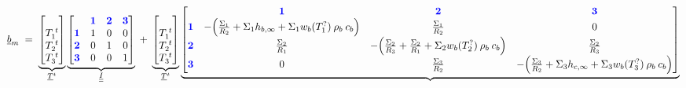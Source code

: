 \begin{landscape}
\begin{center}
{\begin{minipage}{10cm}
					\hspace{-1.8cm}
					\begin{minipage}{1.4\columnwidth}
					\Large{ 
						\begin{gather*}
							\underline{b}_m
							\;=\;
							\underbrace{
									\begin{bmatrix}
										\phantom{   }\\
										T_1^{\; t} \\
										T_2^{\; t} \\
										T_3^{\; t} 
									\end{bmatrix}
							}_{\underline{T}^{t}}
							\underbrace{
									\begin{array}{@{}c@{}}
										\begin{bmatrix}
											& \textcolor{blue}{\textbf{1}} & \textcolor{blue}{\textbf{2}} & \textcolor{blue}{\textbf{3}}  \\
											\textcolor{blue}{\textbf{1}} & 1 & 0 & 0  \\
											\textcolor{blue}{\textbf{2}} & 0 & 1 & 0 \\
											\textcolor{blue}{\textbf{3}} & 0 & 0 & 1  \\
										\end{bmatrix}
									\end{array}
							}_{\underline{\underline{I}}}
							\;+\;	
							\underbrace{								
									\begin{bmatrix}
										\phantom{   }\\
										T_1^{\; t} \\
										T_2^{\; t} \\
										T_3^{\; t} 
									\end{bmatrix}									
							}_{\underline{T}^{t}}
							\underbrace{
									\begin{array}{@{}c@{}}
										\begin{bmatrix}
											& \textcolor{blue}{\textbf{1}} & \textcolor{blue}{\textbf{2}} & \textcolor{blue}{\textbf{3}}  \\
											\textcolor{blue}{\textbf{1}} & -\Big(\frac{\Sigma_1}{R_{2}} + \Sigma_1 h_{b, \infty} +  \Sigma_1 w_b (T_1^?) \: \rho _b \: c_b  \Big) & \frac{\Sigma_1}{R_2} & 0  \\
											\textcolor{blue}{\textbf{2}} & \frac{\Sigma_2}{R_1} &  -  \Big(\frac{\Sigma_2}{R_{3}} + \frac{\Sigma_2}{R_{1}} + \Sigma_2 w_b (T_2^?) \: \rho _b \: c_b  \Big) & \frac{\Sigma_2}{R_3} \\
											\textcolor{blue}{\textbf{3}} & 0 & \frac{\Sigma_3}{R_2} & -  \Big(\frac{\Sigma_3}{R_{2}} + \Sigma_3 h_{c, \infty} + \Sigma_3 w_b (T_3^?) \: \rho _b \: c_b  \Big)  \\

\end{bmatrix}
\end{array}}
\end{gather*}}
\end{minipage}
\end{minipage}}
\end{center}
\end{landscape}
